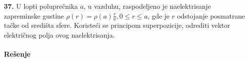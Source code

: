 \textbf{\Large 37.} U lopti polupre\v{c}nika $a$, u vazduhu, raspodeljeno je naelektrisanje zapreminske gustine $\rho(r) = \rho(a)\frac{r}{a}, 0\leq r\leq a$, gde je $r$ odstojanje posmatrane ta\v{c}ke od sredi\v{s}ta sfere. Koriste\'{c}i se principom superpozicije, odrediti vektor elektri\v{c}nog polja ovog naelektrisanja.
\\\\
\textbf{\Large Re\v{s}enje}\\
